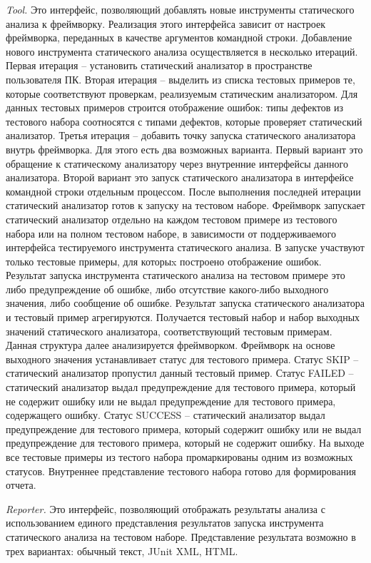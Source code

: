 \textit{Tool.} Это интерфейс, позволяющий добавлять новые инструменты статического анализа к фреймворку. Реализация этого интерфейса зависит от настроек
фреймворка, переданных в качестве аргументов командной строки. Добавление
нового инструмента статического анализа осуществляется в несколько итераций.
Первая итерация – установить статический анализатор в пространстве пользователя ПК. Вторая итерация -- выделить из списка тестовых примеров те, которые
соответствуют проверкам, реализуемым статическим анализатором. Для данных
тестовых примеров строится отображение ошибок: типы дефектов из тестового
набора соотносятся с типами дефектов, которые проверяет статический анализатор. Третья итерация -- добавить точку запуска статического анализатора
внутрь фреймворка. Для этого есть два возможных варианта. Первый вариант это
обращение к статическому анализатору через внутренние интерфейсы данного
анализатора. Второй вариант это запуск статического анализатора в интерфейсе
командной строки отдельным процессом. После выполнения последней итерации
статический анализатор готов к запуску на тестовом наборе. Фреймворк запускает статический анализатор отдельно на каждом тестовом примере из тестового
набора или на полном тестовом наборе, в зависимости от поддерживаемого интерфейса тестируемого инструмента статического анализа. В запуске участвуют только тестовые примеры, для которыx построено отображение ошибок. Результат запуска инструмента статического анализа
на тестовом примере это либо предупреждение об ошибке, либо отсутствие
какого-либо выходного значения, либо сообщение об ошибке. Результат запуска
статического анализатора и тестовый пример агрегируются. Получается тестовый
набор и набор выходных значений статического анализатора, соответствующий тестовым примерам. Данная структура далее анализируется фреймворком.
Фреймворк на основе выходного значения устанавливает статус для тестового
примера. Статус SKIP -- статический анализатор пропустил данный тестовый
пример. Статус FAILED -- статический анализатор выдал предупреждение для тестового примера, который не содержит ошибку или не выдал предупреждение
для тестового примера, содержащего ошибку. Статус SUCCESS -- статический
анализатор выдал предупреждение для тестового примера, который содержит
ошибку или не выдал предупреждение для тестового примера, который не содержит ошибку. На выходе все тестовые примеры из тестого набора промаркированы
одним из возможных статусов. Внутреннее представление тестового набора готово для формирования отчета.

\textit{Reporter.} Это интерфейс, позволяющий отображать результаты анализа с
использованием единого представления результатов запуска инструмента статического анализа на тестовом наборе. Представление результата возможно в трех
вариантах: обычный текст, JUnit XML, HTML.

